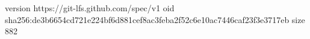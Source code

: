 version https://git-lfs.github.com/spec/v1
oid sha256:de3b6654cd721e224bf6d881cef8ac3feba2f52c6e10ac7446caf23f3e3717eb
size 882
